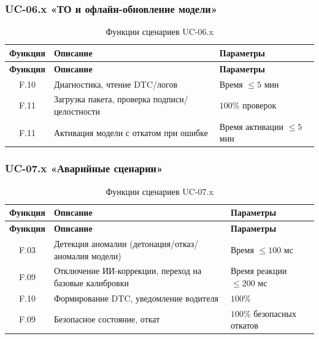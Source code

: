\documentclass[14pt, a4paper]{extarticle}
\begin{document}
					\subsubsection{UC-06.x «ТО и офлайн-обновление модели»}
					
					\begin{xltabular}{\textwidth}{|c|L|L|}
						\caption{Функции сценариев UC-06.x}\label{tab:func-uc06}\\
						\hline
						\textbf{Функция} & \textbf{Описание} & \textbf{Параметры} \\
						\hline
						\endfirsthead
						\hline
						\textbf{Функция} & \textbf{Описание} & \textbf{Параметры} \\
						\hline
						\endhead
						\hline
						\endfoot
						\hline
						\endlastfoot
						F.10 & Диагностика, чтение DTC/логов & Время \(\leq 5\) мин \\
						\hline
						F.11 & Загрузка пакета, проверка подписи/целостности & \(100\%\) проверок \\
						\hline
						F.11 & Активация модели с откатом при ошибке & Время активации \(\leq 5\) мин \\
						\hline
					\end{xltabular}
					
					\subsubsection{UC-07.x «Аварийные сценарии»}
					
					\begin{xltabular}{\textwidth}{|c|L|L|}
						\caption{Функции сценариев UC-07.x}\label{tab:func-uc07}\\
						\hline
						\textbf{Функция} & \textbf{Описание} & \textbf{Параметры} \\
						\hline
						\endfirsthead
						\hline
						\textbf{Функция} & \textbf{Описание} & \textbf{Параметры} \\
						\hline
						\endhead
						\hline
						\endfoot
						\hline
						\endlastfoot
						F.03 & Детекция аномалии (детонация/отказ/аномалия модели) & Время \(\leq 100\) мс \\
						\hline
						F.09 & Отключение ИИ-коррекции, переход на базовые калибровки & Время реакции \(\leq 200\) мс \\
						\hline
						F.10 & Формирование DTC, уведомление водителя & \(100\%\) \\
						\hline
						F.09 & Безопасное состояние, откат & \(100\%\) безопасных откатов \\
						\hline
					\end{xltabular}
					
\end{document}
